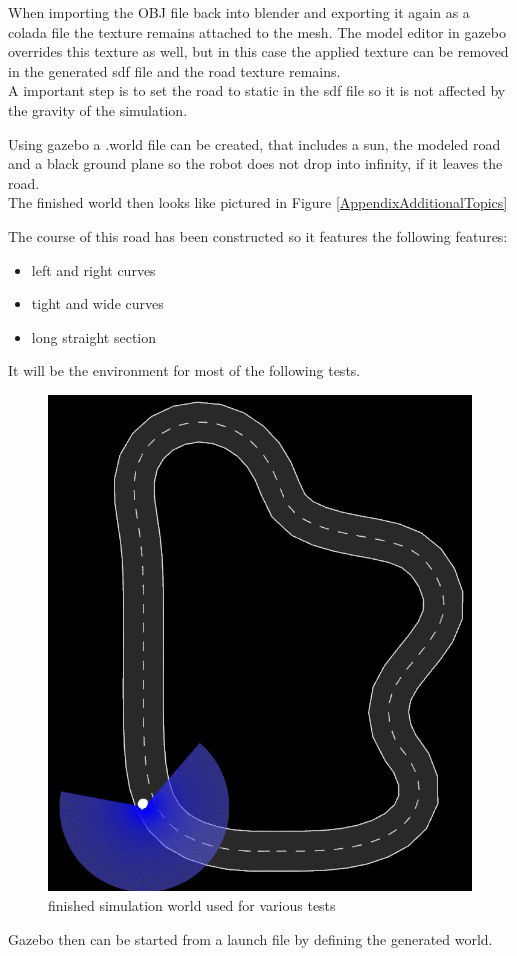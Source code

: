When importing the OBJ file back into blender and exporting it again as a colada file the texture remains attached to the mesh. The model editor in gazebo overrides this texture as well, but in this case the applied texture can be removed in the generated sdf file and the road texture remains.\\

A important step is to set the road to static in the sdf file so it is not affected by the gravity of the simulation.

Using gazebo a .world file can be created, that includes a sun, the modeled road and a black ground plane so the robot does not drop into infinity, if it leaves the road.\\

The finished world then looks like pictured in Figure \ref{AppendixAdditionalTopics}

The course of this road has been constructed so it features the following features:

\begin{itemize}
	\item left and right curves
	\item tight and wide curves
	\item long straight section
\end{itemize}

It will be the environment for most of the following tests.

\begin{figure}
	\centering
	\includegraphics[width=.5\textwidth]{Pictures/test track}
	\caption{finished simulation world used for various tests}
	\label{simworld}
\end{figure}

Gazebo then can be started from a launch file by defining the generated world.\\

